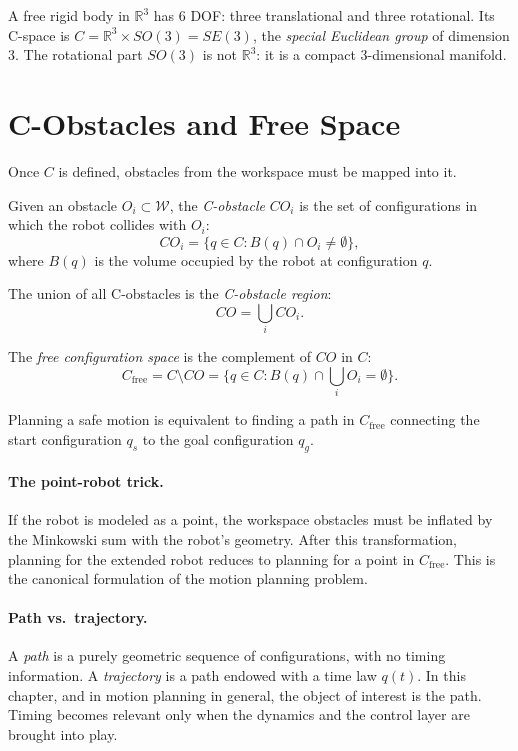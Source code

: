 A free rigid body in \( \mathbb{R}^3 \) has 6 DOF: three translational
and three rotational. Its C-space is
\( C = \mathbb{R}^3 \times SO(3) = SE(3) \), the \emph{special
Euclidean group} of dimension 3. The rotational part \( SO(3) \) is
not \( \mathbb{R}^3 \): it is a compact 3-dimensional manifold.

\section{C-Obstacles and Free Space}
\label{sec:c-obstacles}

Once \( C \) is defined, obstacles from the workspace must be mapped
into it.

\begin{definition}[C-Obstacle]
Given an obstacle \( O_i \subset \mathcal{W} \), the
\emph{C-obstacle} \( CO_i \) is the set of configurations in which
the robot collides with \( O_i \):
\[
CO_i = \{ q \in C : B(q) \cap O_i \neq \emptyset \},
\]
where \( B(q) \) is the volume occupied by the robot at configuration
\( q \).
\end{definition}

The union of all C-obstacles is the \emph{C-obstacle region}:
\[
CO = \bigcup_i CO_i.
\]

\begin{definition}
The \emph{free configuration space} is the complement of \( CO \) in
\( C \):
\[
C_{\text{free}} = C \setminus CO
= \{ q \in C : B(q) \cap \textstyle\bigcup_i O_i = \emptyset \}.
\]
\end{definition}

Planning a safe motion is equivalent to finding a path in
\( C_{\text{free}} \) connecting the start configuration \( q_s \) to
the goal configuration \( q_g \).

\paragraph{The point-robot trick.}
If the robot is modeled as a point, the workspace obstacles must be
inflated by the Minkowski sum with the robot's geometry. After this
transformation, planning for the extended robot reduces to planning
for a point in \( C_{\text{free}} \). This is the canonical formulation
of the motion planning problem.

\paragraph{Path vs.\ trajectory.}
A \emph{path} is a purely geometric sequence of configurations, with
no timing information. A \emph{trajectory} is a path endowed with a
time law \( q(t) \). In this chapter, and in motion planning in
general, the object of interest is the path. Timing becomes relevant
only when the dynamics and the control layer are brought into play.

